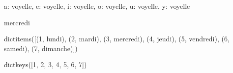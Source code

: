\documentclass[letterpaper,10pt,french]{sphinxmanual}
\begin{document}
\begin{sphinxVerbatim}[commandchars=\\\{\}]
\PYGZob{}\PYGZsq{}a\PYGZsq{}: \PYGZsq{}voyelle\PYGZsq{}, \PYGZsq{}e\PYGZsq{}: \PYGZsq{}voyelle\PYGZsq{}, \PYGZsq{}i\PYGZsq{}: \PYGZsq{}voyelle\PYGZsq{}, \PYGZsq{}o\PYGZsq{}: \PYGZsq{}voyelle\PYGZsq{}, \PYGZsq{}u\PYGZsq{}: \PYGZsq{}voyelle\PYGZsq{}, \PYGZsq{}y\PYGZsq{}: \PYGZsq{}voyelle\PYGZsq{}\PYGZcb{}
\end{sphinxVerbatim}

\begin{sphinxVerbatim}[commandchars=\\\{\}]
\end{sphinxVerbatim}

\begin{sphinxVerbatim}[commandchars=\\\{\}]
mercredi
\end{sphinxVerbatim}

\begin{sphinxVerbatim}[commandchars=\\\{\}]
\end{sphinxVerbatim}

\begin{sphinxVerbatim}[commandchars=\\\{\}]
dict\PYGZus{}items([(1, \PYGZsq{}lundi\PYGZsq{}), (2, \PYGZsq{}mardi\PYGZsq{}), (3, \PYGZsq{}mercredi\PYGZsq{}), (4, \PYGZsq{}jeudi\PYGZsq{}), (5, \PYGZsq{}vendredi\PYGZsq{}), (6, \PYGZsq{}samedi\PYGZsq{}), (7, \PYGZsq{}dimanche\PYGZsq{})])
\end{sphinxVerbatim}

\begin{sphinxVerbatim}[commandchars=\\\{\}]
\end{sphinxVerbatim}

\begin{sphinxVerbatim}[commandchars=\\\{\}]
dict\PYGZus{}keys([1, 2, 3, 4, 5, 6, 7])
\end{sphinxVerbatim}

\begin{sphinxVerbatim}[commandchars=\\\{\}]
\end{sphinxVerbatim}
\end{document}
